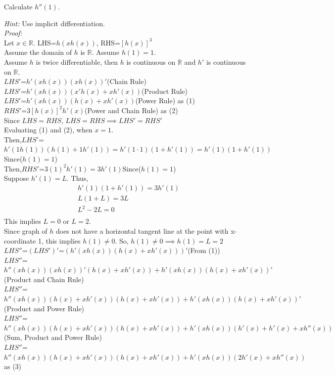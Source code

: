 \documentclass[12pt]{exam}
\newcommand {\DS} [1] {${\displaystyle #1}$}
\newcommand{\vv}{\vspace{.4cm}}
\newcommand{\R}{\mathbb{R}}
\begin{document}
\begin{enumerate}[resume]
	Calculate \DS{h''(1)}.
	
	\emph{Hint:} Use implicit differentiation.
	\vv
	\\
	
	\emph{Proof:}\\
	Let $x\in\R.$
	LHS=$h(xh(x))$, RHS=$[h(x)]^3$\\
	Assume the domain of $h$ is $\R$.
	Assume $h(1)=1.$\\
	Assume $h$ is twice differentiable, then $h$ is continuous on $\R$ and $h'$ is continuous on $\R$.\\
	\DS{LHS'}=$h'(xh(x))(xh(x))'$\qquad(Chain Rule)\\
	\DS{LHS'}=$h'(xh(x))(x'h(x)+xh'(x))$\qquad(Product Rule)\\
	\DS{LHS'}=$h'(xh(x))(h(x)+xh'(x))$\qquad(Power Rule) as (1)\\
	\DS{RHS'}=$3[h(x)]^2h'(x)$\qquad(Power and Chain Rule) as (2)\\
	Since $LHS=RHS$, $LHS=RHS \implies LHS'=RHS'$\\
	Evaluating (1) and (2), when $x=1$. \\
	Then,\DS{LHS'}=$h'(1h(1))(h(1)+1h'(1))=h'(1\cdot1)(1+h'(1))=h'(1)(1+h'(1))$\qquad Since($h(1)=1$)\\
	Then,\DS{RHS'}=$3(1)^2h'(1)=3h'(1)$\qquad Since($h(1)=1$)\\
	Suppose $h'(1)=L.$
	Thus,
	\begin{align*}
	    h'(1)(1+h'(1))=3h'(1)\\
	    L(1+L)=3L\\
	    L^2-2L=0\\
	\end{align*}
	This implies $L=0$ or $L=2.$\\
	Since graph of $h$ does not have a horizontal tangent line at the point with x-coordinate 1, this implies $h(1)\neq0$.
	So, $h(1)\neq0\implies h(1)=L=2$\\
	\DS{LHS''}=\DS{(LHS')'}=$(h'(xh(x))(h(x)+xh'(x)))'$\qquad(From (1))\\
	\DS{LHS''}=$h''(xh(x))(xh(x))'(h(x)+xh'(x))+h'(xh(x))(h(x)+xh'(x))'$\qquad(Product and Chain Rule)\\
	\DS{LHS''}=$h''(xh(x))(h(x)+xh'(x))(h(x)+xh'(x))+h'(xh(x))(h(x)+xh'(x))'$\qquad(Product and Power Rule)\\
	\DS{LHS''}=$h''(xh(x))(h(x)+xh'(x))(h(x)+xh'(x))+h'(xh(x))(h'(x)+h'(x)+xh''(x))$\qquad(Sum, Product and Power Rule)\\
	\DS{LHS''}=$h''(xh(x))(h(x)+xh'(x))(h(x)+xh'(x))+h'(xh(x))(2h'(x)+xh''(x))$\qquad as (3)\\

\end{enumerate}
\end{document}
